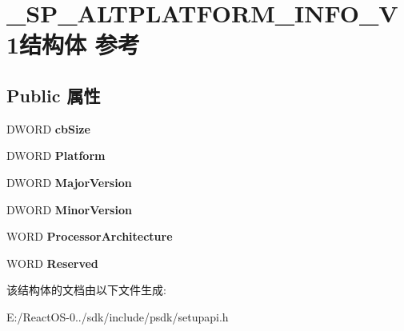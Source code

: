 \hypertarget{struct___s_p___a_l_t_p_l_a_t_f_o_r_m___i_n_f_o___v1}{}\section{\+\_\+\+S\+P\+\_\+\+A\+L\+T\+P\+L\+A\+T\+F\+O\+R\+M\+\_\+\+I\+N\+F\+O\+\_\+\+V1结构体 参考}
\label{struct___s_p___a_l_t_p_l_a_t_f_o_r_m___i_n_f_o___v1}
\subsection*{Public 属性}
\begin{DoxyCompactItemize}
\item 
\mbox{\label{struct___s_p___a_l_t_p_l_a_t_f_o_r_m___i_n_f_o___v1_ab56460ceebde32bc89f988ae923c2b5a}} 
D\+W\+O\+RD {\bfseries cb\+Size}
\item 
\mbox{\label{struct___s_p___a_l_t_p_l_a_t_f_o_r_m___i_n_f_o___v1_add141bc426b2f55346071423a27cef15}} 
D\+W\+O\+RD {\bfseries Platform}
\item 
\mbox{\label{struct___s_p___a_l_t_p_l_a_t_f_o_r_m___i_n_f_o___v1_a44568e9594db0776693d377d2c195281}} 
D\+W\+O\+RD {\bfseries Major\+Version}
\item 
\mbox{\label{struct___s_p___a_l_t_p_l_a_t_f_o_r_m___i_n_f_o___v1_a119e4538ca2bd6a1c74165bf71c9bbb7}} 
D\+W\+O\+RD {\bfseries Minor\+Version}
\item 
\mbox{\label{struct___s_p___a_l_t_p_l_a_t_f_o_r_m___i_n_f_o___v1_afa3c0edc538c32966e2a6c236258164a}} 
W\+O\+RD {\bfseries Processor\+Architecture}
\item 
\mbox{\label{struct___s_p___a_l_t_p_l_a_t_f_o_r_m___i_n_f_o___v1_a7e571e1ae4f5836f0d7514438d4349df}} 
W\+O\+RD {\bfseries Reserved}
\end{DoxyCompactItemize}


该结构体的文档由以下文件生成\+:\begin{DoxyCompactItemize}
\item 
E\+:/\+React\+O\+S-\/0../sdk/include/psdk/setupapi.\+h\end{DoxyCompactItemize}
